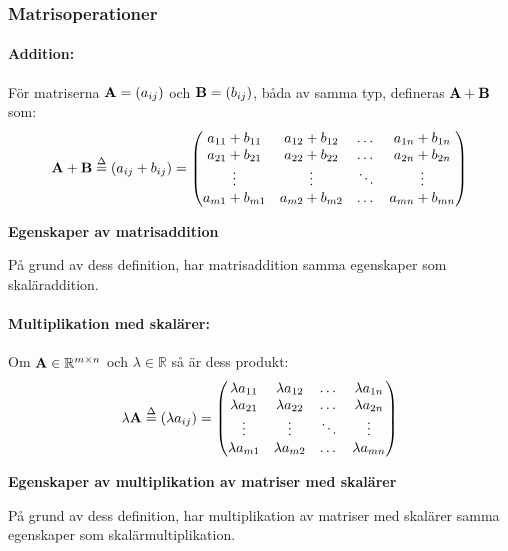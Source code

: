 \subsubsection{Matrisoperationer}

\paragraph{Addition:}
För matriserna $\mathbf{A}=(a_{ij})$ och $\mathbf{B}=(b_{ij})$, båda av samma typ,
defineras $\mathbf{A}+\mathbf{B}$ som:
$$
	\mathbf{A}+\mathbf{B}\stackrel{\Delta}{=}(a_{ij}+b_{ij})=\qty(\begin{matrix}
		a_{11}+b_{11}&a_{12}+b_{12}&\dots&a_{1n}+b_{1n}\\
		a_{21}+b_{21}&a_{22}+b_{22}&\dots&a_{2n}+b_{2n}\\
		\vdots&\vdots&\ddots&\vdots\\
		a_{m1}+b_{m1}&a_{m2}+b_{m2}&\dots&a_{mn}+b_{mn}
	\end{matrix})
$$

\begin{features}
	\textbf{Egenskaper av matrisaddition}

	På grund av dess definition, har matrisaddition samma egenskaper som skaläraddition.
\end{features}

\paragraph{Multiplikation med skalärer:}
Om $\mathbf{A}\in\mathbb{R}^{m\times n}$ och
$\lambda\in\mathbb{R}$ så är dess produkt:
$$
	\lambda\mathbf{A}\stackrel{\Delta}{=}(\lambda a_{ij})=\qty(\begin{matrix}
		\lambda a_{11}&\lambda a_{12}&\dots&\lambda a_{1n}\\
		\lambda a_{21}&\lambda a_{22}&\dots&\lambda a_{2n}\\
		\vdots&\vdots&\ddots&\vdots\\
		\lambda a_{m1}&\lambda a_{m2}&\dots&\lambda a_{mn}
	\end{matrix})
$$

\begin{features}
	\textbf{Egenskaper av multiplikation av matriser med skalärer}

	På grund av dess definition, har multiplikation av matriser med skalärer samma
	egenskaper som skalärmultiplikation.
\end{features}

